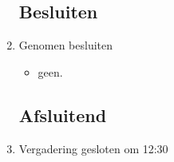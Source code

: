 \documentclass{article}
\begin{document}
\begin{enumerate}
	\subsection*{Besluiten}
	\item Genomen besluiten
	\begin{itemize}
		\item geen.
	\end{itemize}

	\noindent 
	\subsection*{Afsluitend}
	\item Vergadering gesloten om 12:30 %

\end{enumerate}
\end{document}
